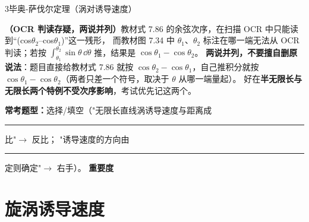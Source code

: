 \begin{kaodian}{3}{毕奥-萨伐尔定理（涡对诱导速度）}
\begin{tishi}
\textbf{（OCR 判读存疑，两说并列）}教材式 7.86 的余弦次序，在扫描 OCR 中只能读到“(cos$\theta_2$--cos$\theta_1$)”这一残形，
而教材图 7.34 中 $\theta_1$、$\theta_2$ 标注在哪一端无法从 OCR 判读；若按 $\displaystyle\int_{\theta_1}^{\theta_2}\sin\theta\,\dd\theta$ 推，结果是 $\cos\theta_1-\cos\theta_2$。
\textbf{两说并列，不要擅自删原说法}：题目直接给教材式 7.86 就按 $\cos\theta_2-\cos\theta_1$，自己推积分就按 $\cos\theta_1-\cos\theta_2$（两者只差一个符号，取决于 $\theta$ 从哪一端量起）。
好在\textbf{半无限长与无限长两个特例不受次序影响}，考试优先记这两个。
\end{tishi}
\textbf{常考题型：}选择/填空（"无限长直线涡诱导速度与距离成\rule{1.2cm}{0.4pt}比"$\to$ 反比；
"诱导速度的方向由\rule{1.6cm}{0.4pt}定则确定"$\to$ 右手）。
\textbf{重要度 }\quad{}\quad{}
\end{kaodian}

\section{旋涡诱导速度}

